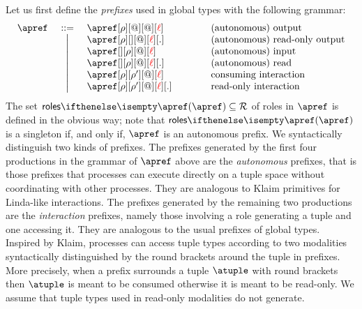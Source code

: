 %
Let us first define the \emph{prefixes} used in global types
with the following grammar:
%
\[\begin{array}{lcl@{\qquad\qquad}l}
  \apref & \bnfdef
  & \apref[\arole][@][@][\alocvar] & \text{(autonomous) output}
  \\ & \bnfmid
  & \apref[\arole][{}][@][\alocvar][.] & \text{(autonomous) read-only output}
  \\ & \bnfmid
  & \apref[{}][\arole][@][\alocvar] & \text{(autonomous) input}
  \\ & \bnfmid
  & \apref[{}][\arole][@][\alocvar][.] & \text{(autonomous) read}
  \\ & \bnfmid
  & \apref[\arole][\arole'][@][\alocvar] & \text{consuming interaction}
  \\ & \bnfmid
  & \apref[\arole][\arole'][@][\alocvar][.]  & \text{read-only interaction}
  \end{array}
\]
%
The set $\roles \apref \subseteq \roleset$ of roles in $\apref$ is
defined in the obvious way; note that $\roles \apref$ is a singleton
if, and only if, $\apref$ is an autonomous prefix.
%
We syntactically distinguish two kinds of prefixes.
%
The prefixes generated by the first four productions in the grammar of
$\apref$ above are the \emph{autonomous} prefixes, that is those
prefixes that processes can execute directly on a tuple space without
coordinating with other processes. 
They are analogous to Klaim primitives for Linda-like interactions.
%
The prefixes generated by the remaining two productions 
are the \emph{interaction} prefixes, namely those involving a role
generating a tuple and one accessing it.
They are analogous to the usual prefixes of global types.
%
Inspired by Klaim, processes can access tuple types according to two
modalities syntactically distinguished by the round brackets around
the tuple in prefixes.
%
More precisely, when a prefix surrounds a tuple $\atuple$ with round
brackets then $\atuple$ is meant to be consumed otherwise it is meant
to be read-only.
%
%
{
  We assume that tuple types used in read-only modalities do not
  generate.
}
%

